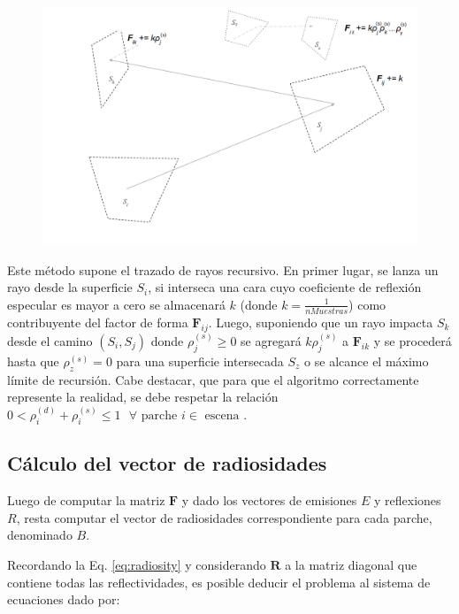 \vspace{5mm}
\begin{figure}[htbp!]
	\includegraphics[width=1\linewidth]{assets/extended2}
	\label{img:caminoespecular}
\end{figure}

Este método supone el trazado de rayos recursivo. En primer lugar, se lanza un rayo desde la superficie $S_{i}$, si  interseca una cara cuyo coeficiente de reflexión especular es mayor a cero se almacenará $k$ (donde $k = \frac{1}{nMuestras}$) como contribuyente del factor de forma $\mathbf{F}_{ij}$. Luego, suponiendo que un rayo impacta $S_{k}$ desde el camino $(S_{i}, S_{j})$ donde $\rho^{(s)}_{j} \ge 0$ se agregará $k\rho^{(s)}_{j}$ a $\mathbf{F}_{ik}$ y se procederá hasta que $\rho^{(s)}_{z} = 0$ para una superficie intersecada $S_{z}$ o se alcance el máximo límite de recursión. Cabe destacar, que para que el algoritmo correctamente represente la realidad, se debe respetar la relación $0 < \rho^{(d)}_{i} + \rho^{(s)}_{i} \leq 1 \text{ } \forall \text{ parche } i \in \text{ escena }$.

\subsection{Cálculo del vector de radiosidades}
\label{sec:vrad}

Luego de computar la matriz $\mathbf{F}$ y dado los vectores de emisiones $E$ y reflexiones $R$, resta computar el vector de radiosidades correspondiente para cada parche, denominado $B$.

Recordando la Eq. \eqref{eq:radiosity} y considerando $\mathbf{R}$ a la matriz diagonal que contiene todas las reflectividades, es posible deducir el problema al sistema de ecuaciones dado por:

